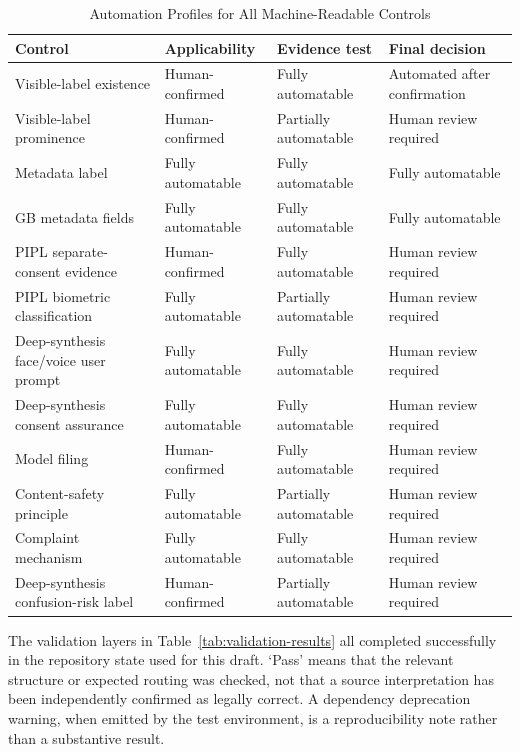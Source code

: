 \documentclass[10pt,journal]{IEEEtran}
\begin{document}
\begin{table}[!t]
\centering
\scriptsize
\caption{Automation Profiles for All Machine-Readable Controls}
\label{tab:all-automation-profiles}
\begin{tabularx}{\textwidth}{@{}p{}p{}p{}p{}@{}}
\toprule
\textbf{Control} & \textbf{Applicability} & \textbf{Evidence test} & \textbf{Final decision} \\
\midrule
Visible-label existence & Human-confirmed & Fully automatable & Automated after confirmation \\
Visible-label prominence & Human-confirmed & Partially automatable & Human review required \\
Metadata label & Fully automatable & Fully automatable & Fully automatable \\
GB metadata fields & Fully automatable & Fully automatable & Fully automatable \\
PIPL separate-consent evidence & Human-confirmed & Fully automatable & Human review required \\
PIPL biometric classification & Fully automatable & Partially automatable & Human review required \\
Deep-synthesis face/voice user prompt & Fully automatable & Fully automatable & Human review required \\
Deep-synthesis consent assurance & Fully automatable & Fully automatable & Human review required \\
Model filing & Human-confirmed & Fully automatable & Human review required \\
Content-safety principle & Fully automatable & Partially automatable & Human review required \\
Complaint mechanism & Fully automatable & Fully automatable & Human review required \\
Deep-synthesis confusion-risk label & Human-confirmed & Partially automatable & Human review required \\
\bottomrule
\end{tabularx}
\end{table}

The validation layers in Table~\ref{tab:validation-results} all completed successfully in the repository state used for this draft. `Pass' means that the relevant structure or expected routing was checked, not that a source interpretation has been independently confirmed as legally correct. A dependency deprecation warning, when emitted by the test environment, is a reproducibility note rather than a substantive result.
\end{document}
